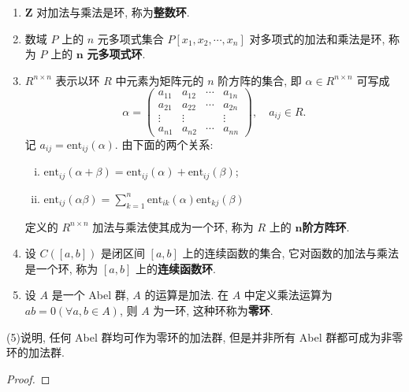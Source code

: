 \documentclass[../../main.tex]{subfiles}
\begin{document}
\begin{example}
\begin{enumerate}[(1)]
\item \( \mathbf{Z} \) 对加法与乘法是环, 称为\textbf{整数环}.

\item 数域 \( P \) 上的 \( n \) 元多项式集合 \( P[x_1,x_2,\cdots,x_n] \) 对多项式的加法和乘法是环, 称为 \( P \) 上的 \( \boldsymbol{n} \) \textbf{元多项式环}. 

\item \( R^{n \times n} \) 表示以环 \( R \) 中元素为矩阵元的 \( n \) 阶方阵的集合, 即 \( \alpha \in R^{n \times n} \) 可写成
\[
\alpha = \begin{pmatrix}
a_{11} & a_{12} & \cdots & a_{1n} \\
a_{21} & a_{22} & \cdots & a_{2n} \\
\vdots & \vdots & & \vdots \\
a_{n1} & a_{n2} & \cdots & a_{nn}
\end{pmatrix}, \quad a_{ij} \in R.
\]
记 \( a_{ij} = \text{ent}_{ij}(\alpha) \). 由下面的两个关系:
\begin{enumerate}[(i)]
\item \( \text{ent}_{ij}(\alpha + \beta) = \text{ent}_{ij}(\alpha) + \text{ent}_{ij}(\beta) \);
\item \( \text{ent}_{ij}(\alpha\beta) = \sum_{k=1}^n \text{ent}_{ik}(\alpha)\text{ent}_{kj}(\beta) \)
\end{enumerate}
定义的 \( R^{n \times n} \) 加法与乘法使其成为一个环, 称为 \( R \) 上的 \(\boldsymbol{n}\)\textbf{阶方阵环}.

\item 设 \( C([a,b]) \) 是闭区间 \([a,b]\) 上的连续函数的集合, 它对函数的加法与乘法是一个环, 称为 \([a,b]\) 上的\textbf{连续函数环}.

\item 设 \( A \) 是一个 Abel 群, \( A \) 的运算是加法. 在 \( A \) 中定义乘法运算为 \( ab = 0 (\forall a,b \in A) \), 则 \( A \) 为一环, 这种环称为\textbf{零环}.
\end{enumerate}
\end{example}
\begin{remark}
(5)说明, 任何 Abel 群均可作为零环的加法群, 但是并非所有 Abel 群都可成为非零环的加法群.
\end{remark}
\begin{proof}

\end{proof}
\end{document}
